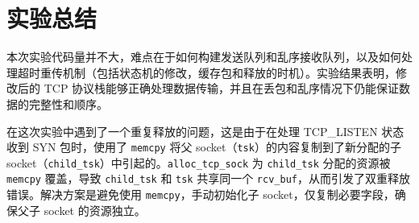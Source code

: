 \documentclass[11pt]{article}
\begin{document}
\section{实验总结}
本次实验代码量并不大，难点在于如何构建发送队列和乱序接收队列，以及如何处理超时重传机制（包括状态机的修改，缓存包和释放的时机）。实验结果表明，修改后的 TCP 协议栈能够正确处理数据传输，并且在丢包和乱序情况下仍能保证数据的完整性和顺序。

在这次实验中遇到了一个重复释放的问题，这是由于在处理 TCP_LISTEN 状态收到 SYN 包时，使用了 \texttt{memcpy} 将父 socket（\texttt{tsk}）的内容复制到了新分配的子 socket（\texttt{child\_tsk}）中引起的。\texttt{alloc\_tcp\_sock} 为 \texttt{child\_tsk} 分配的资源被 \texttt{memcpy} 覆盖，导致 \texttt{child\_tsk} 和 \texttt{tsk} 共享同一个 \texttt{rcv\_buf}，从而引发了双重释放错误。解决方案是避免使用 \texttt{memcpy}，手动初始化子 socket，仅复制必要字段，确保父子 socket 的资源独立。
\end{document}
